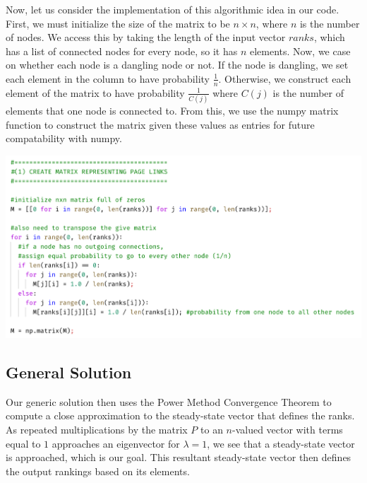 \documentclass{article}
\begin{document}
    \noindent
    Now, let us consider the implementation of this algorithmic idea in our code. First, we must initialize the size of the matrix to be $n \times n$, where $n$ is the number of nodes. We access this by taking the length of the input vector $ranks$, which has a list of connected nodes for every node, so it has $n$ elements. Now, we case on whether each node is a dangling node or not. If the node is dangling, we set each element in the column to have probability $\frac{1}{n}$. Otherwise, we construct each element of the matrix to have probability $\frac{1}{C(j)}$ where $C(j)$ is the number of elements that one node is connected to. From this, we use the numpy matrix function to construct the matrix given these values as entries for future compatability with numpy.
    
    \begin{center}
        \includegraphics[scale=.6]{snip1}
    \end{center}
    
    
    \subsection{General Solution}
   
    Our generic solution then uses the Power Method Convergence Theorem to compute a close approximation to the steady-state vector that defines the ranks. As repeated multiplications by the matrix $P$ to an $n$-valued vector with terms equal to $1$ approaches an eigenvector for $\lambda = 1$, we see that a steady-state vector is approached, which is our goal. This resultant steady-state vector then defines the output rankings based on its elements.
    
\end{document}
